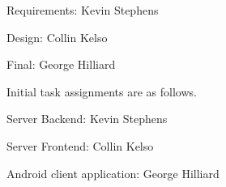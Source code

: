 \documentclass[11pt]{scrartcl}
\begin{document}
    \begin{description*}
        \item[Requirements:] Kevin Stephens
        \item[Design:] Collin Kelso
        \item[Final:] George Hilliard
    \end{description*}

    \noindent
    Initial task assignments are as follows.

    \begin{description*}
        \item[Server Backend:] Kevin Stephens
        \item[Server Frontend:] Collin Kelso
        \item[Android client application:] George Hilliard
    \end{description*}
\end{document}
